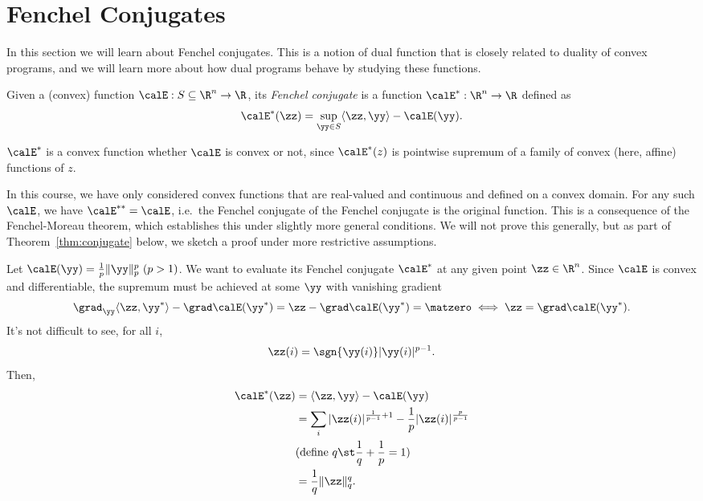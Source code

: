 \section{Fenchel Conjugates}
In this section we will learn about Fenchel conjugates. This is a
notion of dual function that is closely related to duality of convex
programs, and we will learn more about how dual programs behave by
studying these functions.

\begin{definition}
  Given a (convex) function $\calE:S\subseteq\R^n\to\R$, its \emph{Fenchel conjugate} is a function $\calE^*:\R^n\to\R$ defined as
  \[ \calE^*(\zz) = \sup_{\yy\in S} \langle \zz,\yy \rangle - \calE(\yy). \]
\end{definition}

\begin{remark}
  $\calE^*$ is a convex function whether $\calE$ is convex or not, since $\calE^*(z)$ is pointwise supremum of a family of convex (here, affine) functions of $z$.
\end{remark}

In this course, we have only considered convex functions that are
real-valued and continuous and defined on a convex domain. For any such $\calE$, we have $\calE^{**} = \calE$,
i.e.\ the Fenchel conjugate of the Fenchel conjugate is the original
function.
This is a consequence of the Fenchel-Moreau
theorem, which establishes this under slightly more general conditions.
We will not prove this generally, but as part of
Theorem~\ref{thm:conjugate} below, we sketch a proof under more restrictive assumptions.

\begin{example}
  Let $\calE(\yy) = \frac{1}{p}\|\yy\|_p^p ~(p>1)$. We want to evaluate its Fenchel conjugate $\calE^*$ at any given point $\zz\in\R^n$. Since $\calE$ is convex and differentiable, the supremum must be achieved at some $\yy$ with vanishing gradient
  \[ \grad_{\yy}\langle \zz,\yy^* \rangle - \grad\calE(\yy^*) = \zz - \grad\calE(\yy^*) = \matzero \iff \zz = \grad\calE(\yy^*). \]
  It's not difficult to see, for all $i$,
  \[ \zz(i) = \sgn{\yy(i)}|\yy(i)|^{p-1}. \]
  Then,
  \begin{align*}
    \calE^*(\zz)
    &= \langle \zz,\yy \rangle - \calE(\yy) \\
    &= \sum_{i}|\zz(i)|^{\frac{1}{p-1}+1} - \frac{1}{p}|\zz(i)|^{\frac{p}{p-1}} \\
    & (\text{define } q \st \frac{1}{q}+\frac{1}{p} = 1) \\
    &= \frac{1}{q} \|\zz\|_q^q.
  \end{align*}
\end{example}


